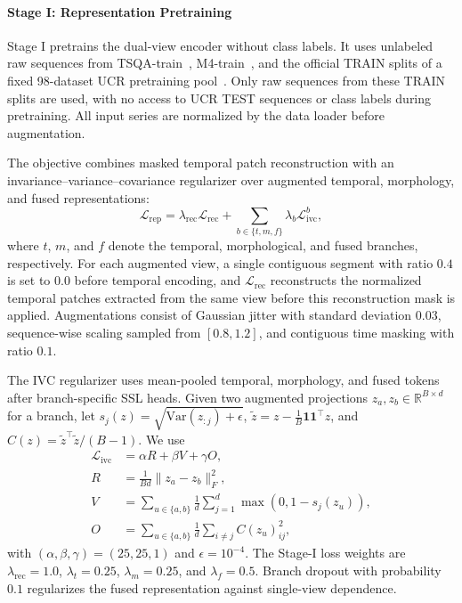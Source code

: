 \documentclass[10pt,journal,compsoc]{IEEEtran}
\begin{document}
\paragraph{Stage I: Representation Pretraining}
Stage I pretrains the dual-view encoder without class labels.
It uses unlabeled raw sequences from TSQA-train~\cite{wang2025chattime}, M4-train~\cite{makridakis2020m4}, and the official TRAIN splits of a fixed 98-dataset UCR pretraining pool~\cite{dau2019ucr}.
Only raw sequences from these TRAIN splits are used, with no access to UCR TEST sequences or class labels during pretraining.
All input series are normalized by the data loader before augmentation.

The objective combines masked temporal patch reconstruction with an invariance--variance--covariance regularizer over augmented temporal, morphology, and fused representations:
\begin{equation}
\label{eq:representation-pretraining-loss}
\mathcal{L}_{\mathrm{rep}}
=
\lambda_{\mathrm{rec}}\mathcal{L}_{\mathrm{rec}}
+
\sum_{b\in\{t,m,f\}}
\lambda_b\mathcal{L}_{\mathrm{ivc}}^b ,
\end{equation}
where $t$, $m$, and $f$ denote the temporal, morphological, and fused branches, respectively.
For each augmented view, a single contiguous segment with ratio $0.4$ is set to $0.0$ before temporal encoding, and $\mathcal{L}_{\mathrm{rec}}$ reconstructs the normalized temporal patches extracted from the same view before this reconstruction mask is applied.
Augmentations consist of Gaussian jitter with standard deviation $0.03$, sequence-wise scaling sampled from $[0.8,1.2]$, and contiguous time masking with ratio $0.1$.

The IVC regularizer uses mean-pooled temporal, morphology, and fused tokens after branch-specific SSL heads.
Given two augmented projections $z_a,z_b\in\mathbb{R}^{B\times d}$ for a branch, let $s_j(z)=\sqrt{\mathrm{Var}(z_{:j})+\epsilon}$, $\tilde{z}=z-\frac{1}{B}\mathbf{1}\mathbf{1}^{\top}z$, and $C(z)=\tilde{z}^{\top}\tilde{z}/(B-1)$.
We use
\begin{equation}
\label{eq:ivc-loss}
\begin{aligned}
\mathcal{L}_{\mathrm{ivc}} &= \alpha R + \beta V + \gamma O,\\
R &= \frac{1}{Bd}\|z_a-z_b\|_F^2,\\
V &= \sum_{u\in\{a,b\}}\frac{1}{d}\sum_{j=1}^{d}\max(0,1-s_j(z_u)),\\
O &= \sum_{u\in\{a,b\}}\frac{1}{d}\sum_{i\ne j} C(z_u)_{ij}^{2},
\end{aligned}
\end{equation}
with $(\alpha,\beta,\gamma)=(25,25,1)$ and $\epsilon=10^{-4}$.
The Stage-I loss weights are $\lambda_{\mathrm{rec}}=1.0$, $\lambda_t=0.25$, $\lambda_m=0.25$, and $\lambda_f=0.5$.
Branch dropout with probability $0.1$ regularizes the fused representation against single-view dependence.
\end{document}
